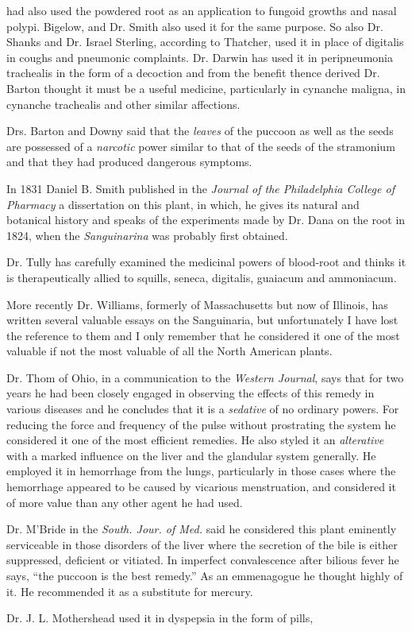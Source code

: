 had also used the powdered root as an application to fungoid growths
and nasal polypi. Bigelow, and Dr. Smith also used it for the same
purpose. So also Dr. Shanks and Dr. Israel Sterling, according to
Thatcher, used it in place of digitalis in coughs and pneumonic complaints.
Dr. Darwin has used it in peripneumonia trachealis in the
form of a decoction and from the benefit thence derived Dr. Barton
thought it must be a useful medicine, particularly in cynanche maligna,
in cynanche trachealis and other similar affections.

Drs. Barton and Downy said that the \emph{leaves} of the puccoon as well as
the seeds are possessed of a \emph{narcotic} power similar to that of the seeds
of the stramonium and that they had produced dangerous symptoms.

In 1831 Daniel B. Smith published in the \emph{Journal of the Philadelphia
College of Pharmacy} a dissertation on this plant, in which,
he gives its natural and botanical history and speaks of the experiments
made by Dr. Dana on the root in 1824, when the \emph{Sanguinarina} was
probably first obtained.

Dr. Tully has carefully examined the medicinal powers of blood-root
and thinks it is therapeutically allied to squills, seneca, digitalis, guaiacum
and ammoniacum.

More recently Dr. Williams, formerly of Massachusetts but now of
Illinois, has written several valuable essays on the Sanguinaria, but
unfortunately I have lost the reference to them and I only remember
that he considered it one of the most valuable if not the most valuable
of all the North American plants.

Dr. Thom of Ohio, in a communication to the \emph{Western Journal},
says that for two years he had been closely engaged in observing the
effects of this remedy in various diseases and he concludes that it is a
\emph{sedative} of no ordinary powers. For reducing the force and frequency
of the pulse without prostrating the system he considered it one of the
most efficient remedies. He also styled it an \emph{alterative} with a marked
influence on the liver and the glandular system generally. He employed
it in hemorrhage from the lungs, particularly in those cases where
the hemorrhage appeared to be caused by vicarious menstruation, and
considered it of more value than any other agent he had used.

Dr. M'Bride in the \emph{South. Jour. of Med.} said he considered this
plant eminently serviceable in those disorders of the liver where the
secretion of the bile is either suppressed, deficient or vitiated. In imperfect
convalescence after bilious fever he says, ``the puccoon is the
best remedy.'' As an emmenagogue he thought highly of it. He
recommended it as a substitute for mercury.

Dr. J. L. Mothershead used it in dyspepsia in the form of pills,\endinput

